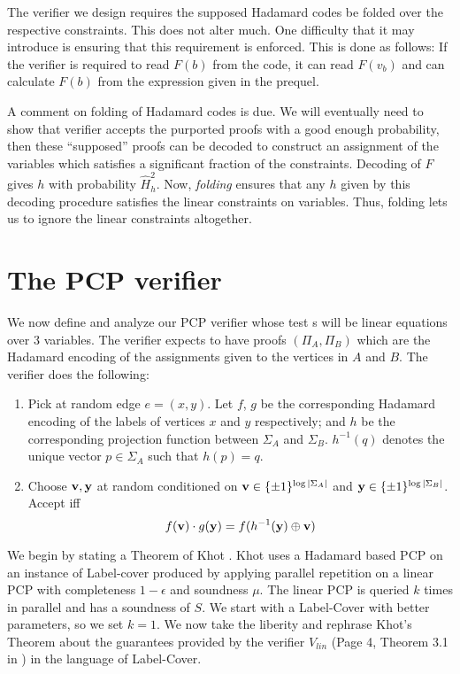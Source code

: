 The verifier we design requires the supposed Hadamard codes be folded
over the respective constraints. This does not alter much. One
difficulty that it may introduce is ensuring that this requirement is
enforced.  This is done as follows: If the verifier is required to
read $F(b)$ from the code, it can read $F(v_b)$ and can calculate
$F(b)$ from the expression given in the prequel.

A comment on folding of Hadamard codes is due. We will eventually need
to show that verifier accepts the purported proofs with a good enough
probability, then these ``supposed'' proofs can be decoded to
construct an assignment of the variables which satisfies a significant
fraction of the constraints. Decoding of $F$ gives $h$ with
probability $\widehat{H}^2_h$. Now, {\em folding} ensures that any $h$
given by this decoding procedure satisfies the linear constraints on
variables. Thus, folding lets us to ignore the linear constraints 
altogether.

\section{The PCP verifier}
We now define and analyze our PCP verifier whose test
s will be linear equations over $3$ 
variables. The verifier expects to have
proofs $(\Pi_A, \Pi_B)$ which are the Hadamard encoding of the assignments
given to the vertices in $A$ and $B$. The verifier does the following:
\begin{enumerate}
\item Pick at random edge $e = (x,y)$. Let $f$, $g$ be the corresponding
 Hadamard encoding of the labels of vertices $x$ and $y$ respectively; 
  and $h$ be the corresponding projection function between $\Sigma_A$ and $\Sigma_B$.
$h^{-1}(q)$ denotes the unique vector $p \in \Sigma_A$ such that $h(p)  = q$. 

\item Choose ${\bf v,y}$ at random conditioned on ${\bf v} \in \{\pm 1\}^{\log |\Sigma_A|}$ 
and ${\bf y} \in \{\pm 1\}^{\log |\Sigma_B|}$. Accept iff 
\[
           f({\bf v}) \cdot g({\bf y}) = f(h^{-1}({\bf y}) \oplus {\bf v})
\]
\end{enumerate}

We begin by stating a Theorem of Khot \cite{Khot01}. Khot uses a
Hadamard based PCP on an instance of {\sc Label-cover} produced by
applying parallel repetition on a linear PCP with completeness $1 -
\epsilon$ and soundness $\mu$. The linear PCP is queried $k$ times in
parallel and has a soundness of $S$. We start with a {\sc Label-Cover} with 
better parameters, so we set $k = 1$. We now take the liberity and rephrase 
Khot's Theorem about the guarantees provided by the verifier $V_{lin}$ 
(Page 4, Theorem 3.1 in \cite{Khot01}) in the language of {\sc Label-Cover}.


